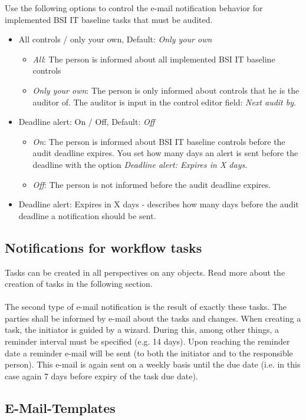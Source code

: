 \documentclass[a4paper,10pt]{book}
\begin{document}
Use the following options to control the e-mail notification behavior for implemented BSI IT baseline tasks that must be audited.
\begin{itemize}
 \item All controls / only your own, Default: {\em Only your own}
  \begin{itemize}
   \item {\em All}: The person is informed about all implemented BSI IT baseline controls
   \item {\em Only your own}: The person is only informed about controls that he is the auditor of. The auditor is input in the control editor field: {\em Next audit by}.
  \end{itemize}
 \item Deadline alert: On / Off, Default: {\em Off}
  \begin{itemize}
   \item {\em On}: The person is informed about BSI IT baseline controls before the audit deadline expires. You set how many days an alert is sent before the deadline with the option {\em Deadline alert: Expires in X days}.
   \item {\em Off}: The person is not informed before the audit deadline expires.
  \end{itemize}
 \item Deadline alert: Expires in X days - describes how many days before the audit deadline a notification should be sent.
\end{itemize}
\subsection{Notifications for workflow tasks}
Tasks can be created in all perspectives on any objects.
Read more about the creation of tasks in the following section.
\\
\\
The second type of e-mail notification is the result of exactly these tasks. The parties shall be informed by e-mail about the tasks and changes. When creating a task, the initiator is guided by a wizard.
During this, among other things, a reminder interval must be specified (e.g. 14 days). Upon reaching the reminder date a reminder e-mail will be sent (to both the initiator and to the responsible person).
This e-mail is again sent on a weekly basis until the due date (i.e. in this case again 7 days before expiry of the task due date).

\subsection{E-Mail-Templates}
\end{document}
